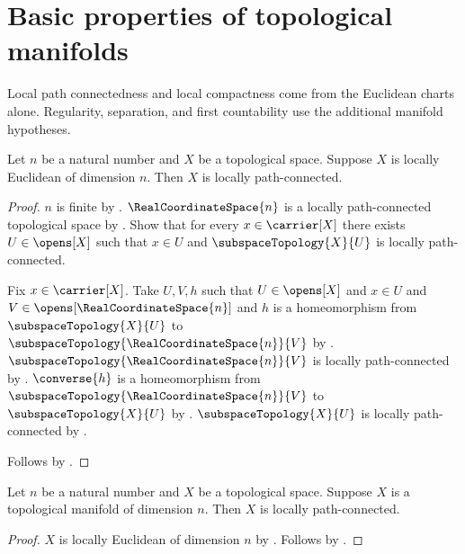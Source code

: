 \section{Basic properties of topological manifolds}






Local path connectedness and local compactness come from the Euclidean charts
alone. Regularity, separation, and first countability use the additional
manifold hypotheses.

\begin{theorem}\label{locally_euclidean_is_locally_path_connected}
    Let $n$ be a natural number and $X$ be a topological space.
    Suppose $X$ is locally Euclidean of dimension $n$.
    Then $X$ is locally path-connected.
\end{theorem}
\begin{proof}
    $n$ is finite by .
    $\RealCoordinateSpace{n}$ is a locally path-connected topological space by
        .
    Show that for every $x\in\carrier[X]$ there exists $U\in\opens[X]$ such that
        $x\in U$ and $\subspaceTopology{X}{U}$ is locally path-connected.
    \begin{subproof}
        Fix $x\in\carrier[X]$.
        Take $U,V,h$ such that $U\in\opens[X]$ and $x\in U$ and
            $V\in\opens[\RealCoordinateSpace{n}]$ and $h$ is a homeomorphism from
            $\subspaceTopology{X}{U}$ to $\subspaceTopology{\RealCoordinateSpace{n}}{V}$ by
            .
        $\subspaceTopology{\RealCoordinateSpace{n}}{V}$ is locally path-connected by
            .
        $\converse{h}$ is a homeomorphism from $\subspaceTopology{\RealCoordinateSpace{n}}{V}$ to
            $\subspaceTopology{X}{U}$ by .
        $\subspaceTopology{X}{U}$ is locally path-connected by
            .
    \end{subproof}
    Follows by .
\end{proof}

\begin{theorem}\label{topological_manifold_is_locally_path_connected}
    Let $n$ be a natural number and $X$ be a topological space.
    Suppose $X$ is a topological manifold of dimension $n$.
    Then $X$ is locally path-connected.
\end{theorem}
\begin{proof}
    $X$ is locally Euclidean of dimension $n$ by .
    Follows by .
\end{proof}

